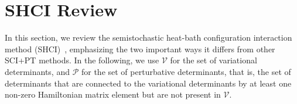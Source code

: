 \documentclass[%
reprint,
 superscriptaddress,
 amsmath,amssymb,
 aps,
]{revtex4-1}
\def\V{\mathcal{V}}
\def\P{\mathcal{P}}
\begin{document}
\section{SHCI Review}
\label{overview}
In this section, we review the semistochastic heat-bath configuration interaction method (SHCI)~\cite{HolTubUmr-JCTC-16,ShaHolJeaAlaUmr-JCTC-17,HolUmrSha-JCP-17},
emphasizing the two important ways it differs from other SCI+PT methods.
In the following, we use $\V$ for the set of variational determinants, and $\P$ for the set of perturbative determinants, that is, the set of determinants that are connected to the variational determinants by at least one non-zero Hamiltonian matrix element but are not present in $\V$.
\end{document}
